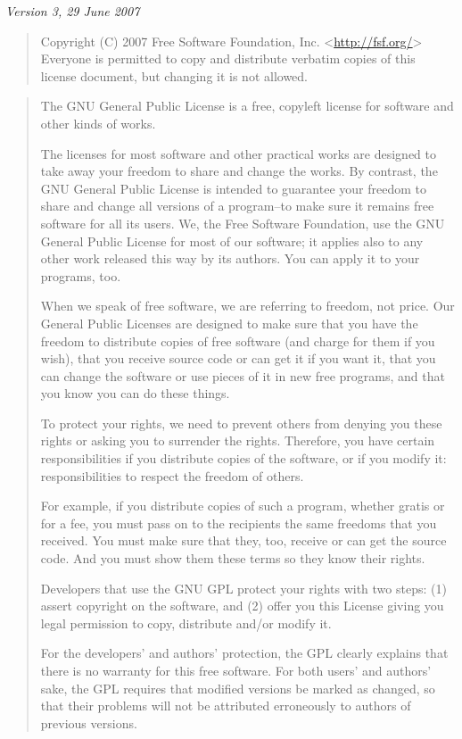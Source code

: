 \documentclass[letterpaper,10pt,english]{sphinxmanual}
\begin{document}
\emph{Version 3, 29 June 2007}
\begin{quote}

Copyright (C) 2007 Free Software Foundation, Inc. \textless{}\href{http://fsf.org/}{http://fsf.org/}\textgreater{}
Everyone is permitted to copy and distribute verbatim copies
of this license document, but changing it is not allowed.
\end{quote}
\begin{quote}

The GNU General Public License is a free, copyleft license for
software and other kinds of works.

The licenses for most software and other practical works are designed
to take away your freedom to share and change the works. By contrast,
the GNU General Public License is intended to guarantee your freedom to
share and change all versions of a program--to make sure it remains free
software for all its users.  We, the Free Software Foundation, use the
GNU General Public License for most of our software; it applies also to
any other work released this way by its authors.  You can apply it to
your programs, too.

When we speak of free software, we are referring to freedom, not
price.  Our General Public Licenses are designed to make sure that you
have the freedom to distribute copies of free software (and charge for
them if you wish), that you receive source code or can get it if you
want it, that you can change the software or use pieces of it in new
free programs, and that you know you can do these things.

To protect your rights, we need to prevent others from denying you
these rights or asking you to surrender the rights.  Therefore, you have
certain responsibilities if you distribute copies of the software, or if
you modify it: responsibilities to respect the freedom of others.

For example, if you distribute copies of such a program, whether
gratis or for a fee, you must pass on to the recipients the same
freedoms that you received.  You must make sure that they, too, receive
or can get the source code.  And you must show them these terms so they
know their rights.

Developers that use the GNU GPL protect your rights with two steps:
(1) assert copyright on the software, and (2) offer you this License
giving you legal permission to copy, distribute and/or modify it.

For the developers' and authors' protection, the GPL clearly explains
that there is no warranty for this free software.  For both users' and
authors' sake, the GPL requires that modified versions be marked as
changed, so that their problems will not be attributed erroneously to
authors of previous versions.


\end{quote}
\end{document}
